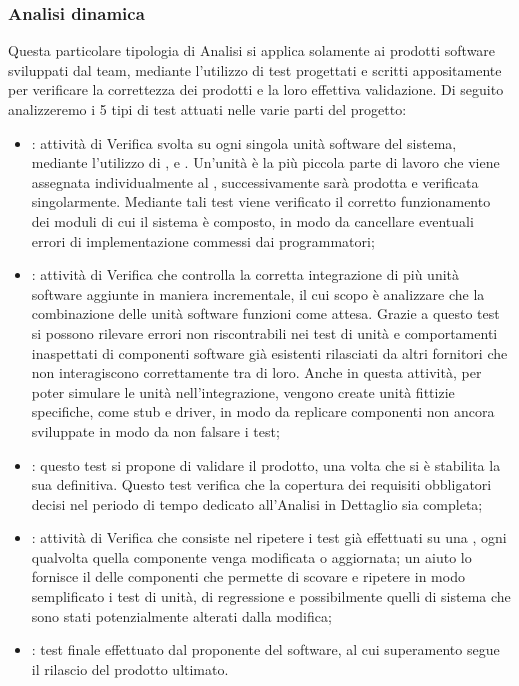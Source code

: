 \subsubsection{Analisi dinamica}
\label{3.2}
Questa particolare tipologia di Analisi si applica solamente ai prodotti software sviluppati dal team, mediante l'utilizzo di test progettati e scritti appositamente per verificare la correttezza dei prodotti e la loro effettiva validazione.
Di seguito analizzeremo i 5 tipi di test attuati nelle varie parti del progetto:
\begin{itemize}
\item {}: attività di Verifica svolta su ogni singola unità software del sistema, mediante l'utilizzo di ,  e . Un'unità è la più piccola parte di lavoro che viene assegnata individualmente al , successivamente sarà prodotta e verificata singolarmente. Mediante tali test viene verificato il corretto funzionamento dei moduli di cui il sistema è composto, in modo da cancellare eventuali errori di implementazione commessi dai programmatori;
\item {}: attività di Verifica che controlla la corretta integrazione di più unità software aggiunte in maniera incrementale, il cui scopo è analizzare che la combinazione delle unità software funzioni come attesa. Grazie a questo test si possono rilevare errori non riscontrabili nei test di unità e comportamenti inaspettati di componenti software già esistenti rilasciati da altri fornitori che non interagiscono correttamente tra di loro. Anche in questa attività, per poter simulare le unità nell'integrazione, vengono create unità fittizie specifiche, come stub e driver, in modo da replicare componenti non ancora sviluppate in modo da non falsare i test;
\item {}: questo test si propone di validare il prodotto, una volta che si è stabilita  la sua  definitiva. Questo test verifica che la copertura dei requisiti obbligatori decisi nel periodo di tempo dedicato all'Analisi in Dettaglio sia completa;
\item {}: attività di Verifica che consiste nel ripetere i test già effettuati su una , ogni qualvolta quella componente venga modificata o aggiornata; un aiuto lo fornisce il  delle componenti che permette di scovare e ripetere in modo semplificato i test di unità, di regressione e possibilmente quelli di sistema che sono stati potenzialmente alterati dalla modifica;
\item {}: test finale effettuato dal proponente del software, al cui superamento segue il rilascio del prodotto ultimato.
\end{itemize}
